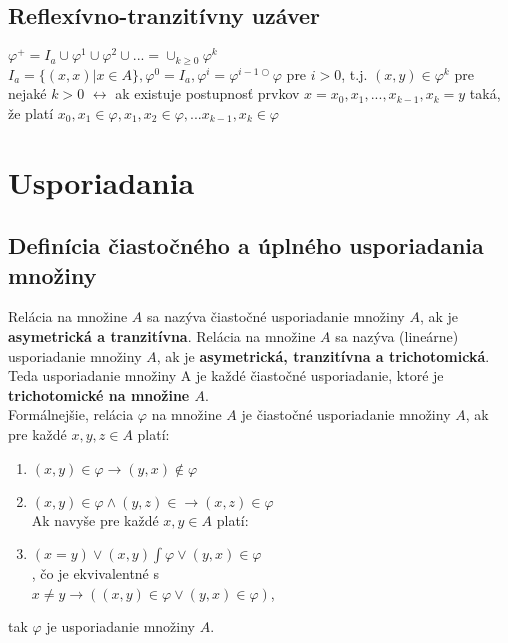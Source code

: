 	\subsection {Reflexívno-tranzitívny uzáver}
		$\varphi^{+} = I_{a} \cup \varphi^{1} \cup \varphi^{2} \cup ... = \cup_{k \geq 0} \varphi^k$ \\
		
		$I_{a} = \{ ( x, x ) | x \in A \}, \varphi^{0} = I_{a}, \varphi^{i} = \varphi^{i-1 \bigcirc}\varphi$ pre $i> 0$, t.j. $(x, y) \in \varphi^{k}$ pre nejaké $k>0$ $\leftrightarrow $ ak existuje postupnosť prvkov $x = x_{0}, x_{1}, ..., x_{k-1}, x_{k} = y$ taká, že platí ${x_{0}, x_{1}} \in \varphi,  {x_{1}, x_{2}} \in \varphi, ... {x_{k-1}, x_{k}} \in \varphi$


\section{Usporiadania}
	\subsection{Definícia čiastočného a úplného usporiadania množiny}
		Relácia na množine $A$ sa nazýva čiastočné usporiadanie množiny $A$, ak je \textbf{asymetrická a tranzitívna}. Relácia na množine $A$ sa nazýva (lineárne) usporiadanie množiny $A$, ak je \textbf{asymetrická, tranzitívna a trichotomická}. Teda usporiadanie množiny A je každé čiastočné usporiadanie, ktoré je \textbf{trichotomické na množine $A$}.\\

		Formálnejšie, relácia $\varphi$ na množine $A$ je čiastočné usporiadanie množiny $A$, ak pre každé $ x, y, z \in A $ platí:
		\begin{enumerate}
		\item $( x, y) \in \varphi \rightarrow ( y, x ) \notin \varphi$
		\item $( x, y) \in \varphi \wedge ( y,z) \in  \rightarrow ( x, z) \in \varphi$ \\
		
		Ak navyše pre každé $x, y \in A$ platí:
		\item $( x = y) \vee ( x, y ) \int \varphi \vee ( y, x ) \in \varphi$ \\, čo je ekvivalentné s \\
		$ x \neq y \rightarrow (( x, y) \in \varphi \vee ( y, x ) \in \varphi)$,
		\end{enumerate}
		tak $\varphi$ je usporiadanie množiny $A$.\\


